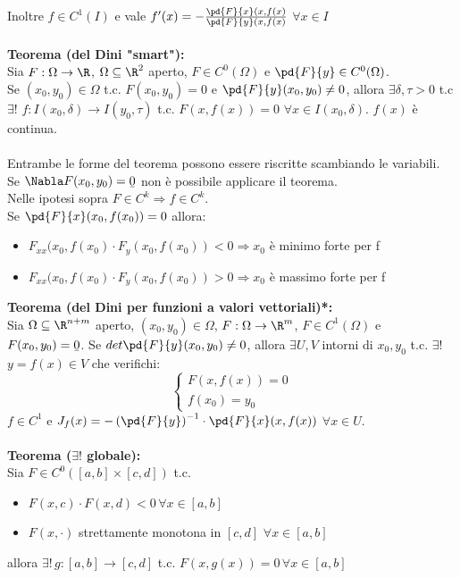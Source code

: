 \documentclass{article}
\begin{document}
Inoltre $f\in C^1(I)$ e vale $f'(x)=-\frac{\pd{F}{x}(x,f(x)}{\pd{F}{y}(x,f(x)}$ $\forall x\in I$\\\\
\textbf{Teorema (del Dini "smart"):}\\
Sia $F:\Omega\rightarrow\R$, $\Omega\subseteq\R^2$ aperto, $F\in C^0(\Omega)$ e $\pd{F}{y}\in C^0(\Omega)$.\\
Se $(x_0,y_0)\in\Omega$ t.c. $F(x_0,y_0)=0$ e $\pd{F}{y}(x_0,y_0)\neq0$, allora $\exists\delta,\tau>0$
 t.c $\exists!$ $f:I(x_0,\delta)\rightarrow I(y_0,\tau)$ t.c. $F(x,f(x))=0$ $\forall x\in I(x_0,\delta)$.
 $f(x)$ è continua.\\\\
 Entrambe le forme del teorema possono essere riscritte scambiando le variabili.\\
 Se $\Nabla F(x_0,y_0)=\ubar{0}$ non è possibile applicare il teorema.\\
 Nelle ipotesi sopra $F\in C^k\Rightarrow f\in C^k$.\\
 Se $\pd{F}{x}(x_0,f(x_0))=0$ allora:
 \begin{itemize}
     \item $F_{xx}(x_0,f(x_0)\cdot F_y(x_0, f(x_0))<0\Rightarrow x_0$ è minimo forte per f
     \item $F_{xx}(x_0,f(x_0)\cdot F_y(x_0, f(x_0))>0\Rightarrow x_0$ è massimo forte per f
 \end{itemize}
 \textbf{Teorema (del Dini per funzioni a valori vettoriali)*:}\\
 Sia $\Omega\subseteq\R^{n+m}$ aperto, $(x_0,y_0)\in\Omega$, $F:\Omega\rightarrow\R^m$, $F\in C^1(\Omega)$ e $F(x_0,y_0)=\ubar{0}$. Se $det\pd{F}{y}(x_0,y_0)\neq0$, allora $\exists U,V$ intorni di $x_0,y_0$ t.c. $\exists!$ $y=f(x)\in V$ che verifichi:
 \begin{equation*}
     \begin{cases}
     F(x,f(x))=0\\
     f(x_0)=y_0
     \end{cases}
 \end{equation*}
$f\in C^1$ e $J_f(x)=-\left(\pd{F}{y}\right)^{-1}\cdot \pd{F}{x}(x,f(x))$ $\forall x\in U$.\\\\
\textbf{Teorema ($\exists!$ globale):}\\
Sia $F\in C^0([a,b]\times[c,d])$ t.c.
\begin{itemize}
    \item $F(x,c)\cdot F(x,d)<0\,\forall x\in[a,b]$
    \item $F(x,\cdot)$ strettamente monotona in $[c,d]$ $\forall x\in[a,b]$
\end{itemize}
allora $\exists!\,g:[a,b]\rightarrow[c,d]$ t.c. $F(x,g(x))=0\,\forall x\in[a,b]$
\end{document}
